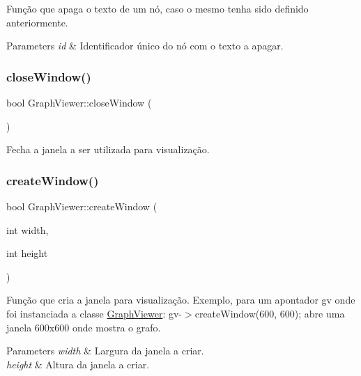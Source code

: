 Função que apaga o texto de um nó, caso o mesmo tenha sido definido anteriormente.


\begin{DoxyParams}{Parameters}
{\em id} & Identificador único do nó com o texto a apagar. \\
\hline
\end{DoxyParams}
\mbox{\label{class_graph_viewer_a85990c1eaac7feed3950960d4bd2fd4c}} 
\subsubsection{\texorpdfstring{close\+Window()}{closeWindow()}}
{\footnotesize\ttfamily bool Graph\+Viewer\+::close\+Window (\begin{DoxyParamCaption}{ }\end{DoxyParamCaption})}

Fecha a janela a ser utilizada para visualização. \mbox{\label{class_graph_viewer_ae5247dc66449dcd21fc5d531bbbaddfa}} 
\subsubsection{\texorpdfstring{create\+Window()}{createWindow()}}
{\footnotesize\ttfamily bool Graph\+Viewer\+::create\+Window (\begin{DoxyParamCaption}\item[{int}]{width,  }\item[{int}]{height }\end{DoxyParamCaption})}

Função que cria a janela para visualização. Exemplo, para um apontador gv onde foi instanciada a classe \hyperlink{class_graph_viewer}{Graph\+Viewer}\+: gv-\/$>$create\+Window(600, 600); abre uma janela 600x600 onde mostra o grafo.


\begin{DoxyParams}{Parameters}
{\em width} & Largura da janela a criar. \\
\hline
{\em height} & Altura da janela a criar. \\
\hline
\end{DoxyParams}
\mbox{\label{class_graph_viewer_a4102580b69826ba83251ef7bb262f8be}} 
